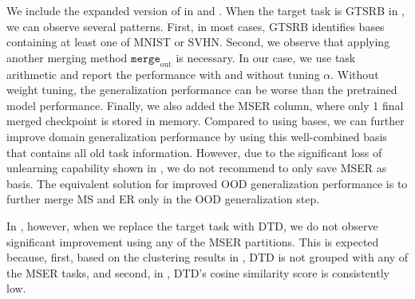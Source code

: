 We include the expanded version of  in  and . When the target task is GTSRB in , we can observe several patterns. First, in most cases, GTSRB identifies bases containing at least one of MNIST or SVHN. Second, we observe that applying another merging method $\texttt{merge}_\text{out}$ is necessary. In our case, we use task arithmetic and report the performance with and without tuning $\alpha$. Without weight tuning, the generalization performance can be worse than the pretrained model performance. Finally, we also added the MSER column, where only 1 final merged checkpoint is stored in memory. Compared to using bases, we can further improve domain generalization performance by using this well-combined basis that contains all old task information. However, due to the significant loss of unlearning capability shown in , we do not recommend to only save MSER as basis. The equivalent solution for improved OOD generalization performance is to further merge MS and ER only in the OOD generalization step.

In , however, when we replace the target task with DTD, we do not observe significant improvement using any of the MSER partitions. This is expected because, first, based on the clustering results in , DTD is not grouped with any of the MSER tasks, and second, in , DTD’s cosine similarity score is consistently low.

